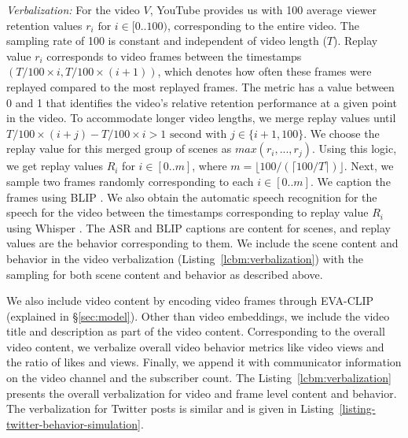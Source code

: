 \textit{Verbalization:} For the video $V$, YouTube provides us with 100 average viewer retention values $r_i \text{ for } i\in[0..100)$, corresponding to the entire video. The sampling rate of 100 is constant and independent of video length ($T$). Replay value $r_i$ corresponds to video frames between the timestamps $(T/100\times i, T/100\times(i+1))$, which denotes how often these frames were replayed compared to the most replayed frames. The metric has a value between 0 and 1 that identifies the video's relative retention performance at a given point in the video. To accommodate longer video lengths, we merge replay values until $T/100\times(i+j)-T/100\times i > 1 \text{ second with } j\in\{i+1,100\}$. We choose the replay value for this merged group of scenes as $max(r_i,..., r_j)$. Using this logic, we get replay values $R_i$ for $i \in[0..m]$, where $m=\lfloor 100/(\lceil 100/T \rceil) \rfloor$.
Next, we sample two frames randomly corresponding to each $i \in [0..m]$. We caption the frames using BLIP \cite{li2023blip2}. We also obtain the automatic speech recognition for the speech for the video between the timestamps corresponding to replay value $R_i$ using Whisper \cite{radford2023robust}. The ASR and BLIP captions are content for scenes, and replay values are the behavior corresponding to them. We include the scene content and behavior in the video verbalization (Listing~\ref{lcbm:verbalization}) with the sampling for both scene content and behavior as described above. %

We also include video content by encoding video frames through EVA-CLIP \cite{sun2023eva} (explained in \S\ref{sec:model}). Other than video embeddings, we include the video title and description as part of the video content. Corresponding to the overall video content, we verbalize overall video behavior metrics like video views and the ratio of likes and views. Finally, we append it with communicator information on the video channel and the subscriber count. The Listing~\ref{lcbm:verbalization} presents the overall verbalization for video and frame level content and behavior. The verbalization for Twitter posts is similar and is given in Listing~\ref{listing-twitter-behavior-simulation}.

